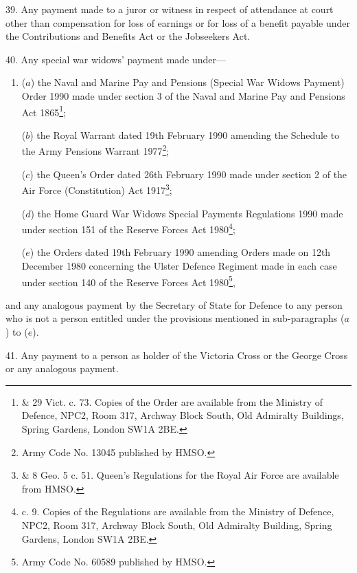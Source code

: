 \documentclass[12pt,a4paper]{article}
\begin{document}
39.  Any payment made to a juror or witness in respect of attendance at court other than compensation for loss of earnings or for loss of a benefit payable under the Contributions and Benefits Act
or the Jobseekers Act.  %


\medskip

40.  Any special war widows' payment made under—
\begin{enumerate}\item[]
($a$) the Naval and Marine Pay and Pensions (Special War Widows Payment) Order 1990 made under section 3 of the Naval and Marine Pay and Pensions Act 1865\footnote{ \& 29 Vict. c. 73. Copies of the Order are available from the Ministry of Defence, NPC2, Room 317, Archway Block South, Old Admiralty Buildings, Spring Gardens, London SW1A 2BE.};

($b$) the Royal Warrant dated 19th February 1990 amending the Schedule to the Army Pensions Warrant 1977\footnote{\frenchspacing Army Code No. 13045 published by HMSO.};

($c$) the Queen’s Order dated 26th February 1990 made under section 2 of the Air Force (Constitution) Act 1917\footnote{ \& 8 Geo. 5 c. 51. Queen’s Regulations for the Royal Air Force are available from HMSO.};

($d$) the Home Guard War Widows Special Payments Regulations 1990 made under section 151 of the Reserve Forces Act 1980\footnote{ c. 9. Copies of the Regulations are available from the Ministry of Defence, NPC2, Room 317, Archway Block South, Old Admiralty Building, Spring Gardens, London SW1A 2BE.};

($e$) the Orders dated 19th February 1990 amending Orders made on 12th December 1980 concerning the Ulster Defence Regiment made in each case under section 140 of the Reserve Forces Act 1980\footnote{\frenchspacing Army Code No. 60589 published by HMSO.},
\end{enumerate}
and any analogous payment by the Secretary of State for Defence to any person who is not a person entitled under the provisions mentioned in sub-paragraphs ($a$) to ($e$).

\medskip

41.  Any payment to a person as holder of the Victoria Cross or the George Cross or any analogous payment.
\end{document}
